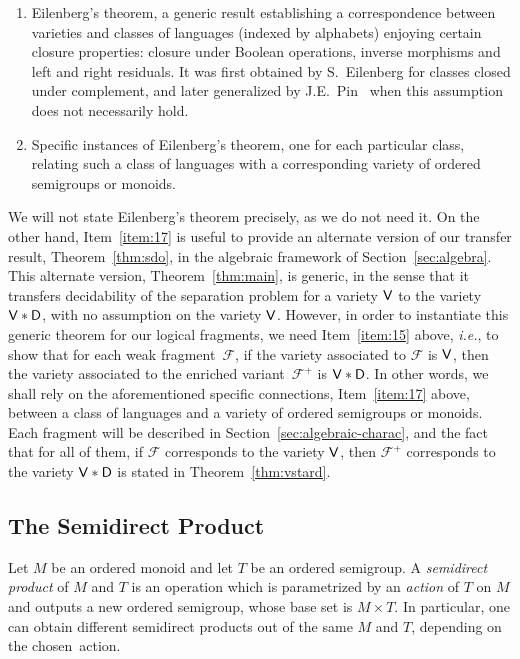 \documentclass[a4paper,USenglish]{lipics}
\newcommand\Fs{\ensuremath{\mathcal{F}}\xspace}
\newcommand\Vbf{\ensuremath{{\sf V}}\xspace}
\newcommand\Dbf{\ensuremath{{\sf D}}\xspace}
\theoremstyle{plain}
\begin{document}
\begin{enumerate}[label=$(\alph*)$]
\item\label{item:16} Eilenberg's theorem, a generic result establishing a
  correspondence between varieties and classes of languages (indexed by
  alphabets) enjoying certain closure properties: closure under Boolean
  operations, inverse morphisms and left and right residuals. It
  was first obtained by S.~Eilenberg for classes closed under complement, and
  later generalized by J.E.~Pin~\cite{porder} when this assumption does not
  necessarily hold.

\item\label{item:17} Specific instances of Eilenberg's theorem, one for each
  particular class, relating such a class of languages
  with a corresponding variety of ordered semigroups or monoids.
\end{enumerate}

We will not state Eilenberg's theorem precisely, as we do not need it. On the
other hand, Item~\ref{item:17} is useful to provide an alternate version of
our transfer result, Theorem~\ref{thm:sdo}, in the algebraic framework of
Section~\ref{sec:algebra}. This alternate version, Theorem~\ref{thm:main}, is
generic, in the sense that it transfers decidability of the separation problem
for a variety $\Vbf$ to the variety $\Vbf * \Dbf$, with no assumption on the
variety \Vbf. However, in order to instantiate this generic theorem for our
logical fragments, we need Item~\ref{item:15} above, \emph{i.e.}, to show that
for each weak fragment~\Fs, if the variety associated to \Fs is \Vbf, then the
variety associated to the enriched variant~$\Fs^+$ is $\Vbf\ast\Dbf$. In other
words, we shall rely on the aforementioned specific connections,
Item~\ref{item:17} above, between a class of languages and a variety of
ordered semigroups or monoids. Each fragment will be described in
Section~\ref{sec:algebraic-charac}, and the fact that for all of them, if \Fs
corresponds to the variety \Vbf, then $\Fs^+$ corresponds to the variety
$\Vbf * \Dbf$ is stated in Theorem~\ref{thm:vstard}.

\subsection{The Semidirect Product}
\label{sec:semidirect-product}

Let $M$ be an ordered monoid and let $T$ be an ordered semigroup. A
\emph{semidirect product} of $M$ and $T$ is an operation which is parametrized
by an \emph{action} of $T$ on $M$ and outputs a new ordered semigroup, whose
base set is $M\times T$. In particular, one can obtain different semidirect
products out of the same $M$ and $T$, depending on the chosen~action.
\end{document}
